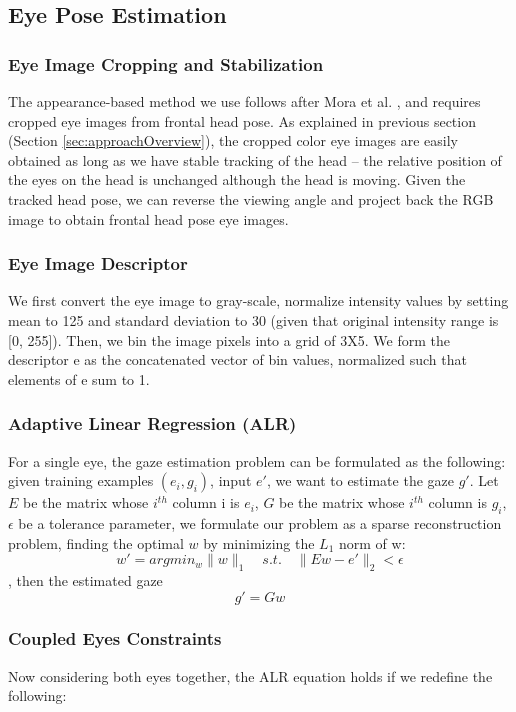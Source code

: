 \subsection{Eye Pose Estimation}

\subsubsection{Eye Image Cropping and Stabilization}
The appearance-based method we use follows after Mora et al. \cite{funes2013person}, and requires cropped eye images from frontal head pose.  As explained in previous section (Section \ref{sec:approachOverview}), the cropped color eye images are easily obtained as long as we have stable tracking of the head -- the relative position of the eyes on the head is unchanged although the head is moving.  Given the tracked head pose, we can reverse the viewing angle and project back the RGB image to obtain frontal head pose eye images.


\subsubsection{Eye Image Descriptor}
We first convert the eye image to gray-scale, normalize intensity values by setting mean to 125 and standard deviation to 30 (given that original intensity range is [0, 255]).  Then, we bin the image pixels into a grid of 3X5.  We form the descriptor e as the concatenated vector of bin values, normalized such that elements of e sum to 1.


\subsubsection{Adaptive Linear Regression (ALR)}
For a single eye, the gaze estimation problem can be formulated as the following: given training examples \( {(e_i,g_i )} \), input \(e'\), we want to estimate the gaze \(g'\).
Let \(E\) be the matrix whose \(i^{th}\) column i is \( e_i \), \(G\) be the matrix whose \(i^{th}\) column is \(g_i\), \(\epsilon\) be a tolerance parameter, we formulate our problem as a sparse reconstruction problem, finding the optimal \(w\) by minimizing the \(L_1\) norm of w:
\[ w' = argmin_w \|w\|_1  \quad  s.t.   \quad   \|Ew - e'\|_2 < \epsilon   \]
, then the estimated gaze \[ g' = Gw \]


\subsubsection{Coupled Eyes Constraints}
Now considering both eyes together, the ALR equation holds if we redefine the following:

